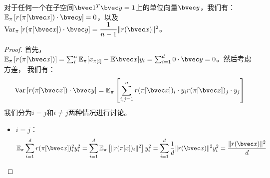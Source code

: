 \begin{theorem}
\label{thm:ss-perm:perm-dist}
    对于任何一个在子空间$\bvec 1^T \bvec y = 1$上的单位向量$\bvec y$，我们有：
    $\mathbb E_\pi \left[r(\pi[\bvec x])  \cdot \bvec y\right] = 0$，以及$\textnormal{Var}_\pi \left[ r(\pi[\bvec x])\cdot \bvec y \right] = \dfrac{1}{n - 1} \Vert r(\bvec x) \Vert^2$。
\end{theorem}
%
\begin{proof}
首先，$\mathbb E_\pi  \left[r(\pi[\bvec x])\right] = \sum_{i}^n \mathbb E_\pi [x_{\pi[i]} - \mathbb E\bvec x] y_i = \sum_{i=1}^d 0 \cdot \bvec y = 0$。然后考虑方差，
我们有：
\begin{equation}
\begin{split}
    \text{Var}\left[ r(\pi[\bvec x])\cdot \bvec y \right] = \mathbb E_\pi \left[\sum_{i,j=1}^n  r(\pi[\bvec x])_i\cdot y_i r(\pi[\bvec x])_j\cdot y_j \right]
\end{split}
\end{equation}
我们分为$i = j$和$i \ne j$两种情况进行讨论。
\begin{itemize}
    \item $i = j$：
    \begin{equation}
        \mathbb E_\pi \sum_{i = 1}^d r(\pi[\bvec x])_i^2 y_i^2 = \sum_{i=1}^d \mathbb E_\pi \left[ \Vert r(\pi[x])_i\Vert^2 \right] y_i^2 = \sum_{i=1}^d \dfrac{1}{d} \Vert r(\bvec x) \Vert^2 y_i^2 = \dfrac{\Vert r(\bvec x)\Vert^2}d
    \end{equation}
    

\end{itemize}
\end{proof}
